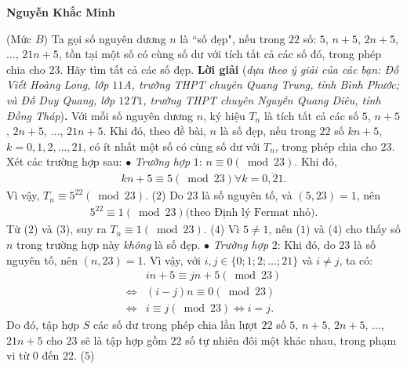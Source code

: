 \begin{multicols}{2}
	\begin{flushright}
		\textbf{\color{thachthuctoanhoc}Nguyễn Khắc Minh}
	\end{flushright}
	{}
	(Mức $B$) Ta gọi số nguyên dương $n$ là ``số đẹp", nếu trong $22$ số: $5$, $n + 5$, $2n + 5$, $\ldots$, $21n + 5$, tồn tại một số có cùng số dư với tích tất cả các số đó, trong phép chia cho $23$. Hãy tìm tất cả các số đẹp.
	\vskip 0.05cm
	\textbf{\color{thachthuctoanhoc}Lời giải} (\textit{dựa theo ý giải của các bạn: Đỗ Viết Hoàng Long, lớp $11$A, trường THPT chuyên Quang Trung, tỉnh Bình Phước; và Đỗ Duy Quang, lớp $12$T$1$, trường THPT chuyên Nguyễn Quang Diêu, tỉnh Đồng Tháp})\textbf{\color{thachthuctoanhoc}.}
	\vskip 0.05cm
	Với mỗi số nguyên dương $n$, ký hiệu $T_n$ là tích tất cả các số $5$, $n + 5$, $2n + 5$, $\ldots$, $21n + 5$.
	\vskip 0.05cm
	Khi đó, theo đề bài, $n$ là số đẹp, nếu trong $22$ số $kn + 5$, $k = 0, 1, 2, \ldots, 21$, có ít nhất một số có cùng số dư với  $T_n$, trong phép chia cho $23$.
	\vskip 0.05cm
	Xét các trường hợp sau:
	\vskip 0.05cm
	$\bullet$ \textit{Trường hợp} $1$: $n \equiv 0\left( {\bmod 23} \right).$
	\vskip 0.05cm  
	Khi đó,
	\begin{align*}
		kn + 5 \equiv 5\left( {\bmod 23} \right)\forall k = \overline {0,21} . \tag{$1$}
	\end{align*}
	Vì vậy, ${T_n} \equiv {5^{22}}\left( {\bmod 23} \right).$ \hfill ($2$)
	\vskip 0.05cm
	Do $23$ là số nguyên tố, và $(5, 23) = 1$, nên
	\begin{align*}
		{5^{22}} \equiv 1\left( {\bmod 23} \right)	\text{(theo Định lý Fermat nhỏ).} \tag{$3$}
	\end{align*}
	Từ ($2$) và ($3$), suy ra  ${T_n} \equiv 1\left( {\bmod 23} \right).$ \hfill ($4$)
	\vskip 0.05cm
	Vì $5 \ne 1$, nên ($1$) và ($4$) cho thấy số $n$ trong trường hợp này \textit{không} là số đẹp.
	\vskip 0.05cm
	$\bullet$ \textit{Trường hợp} $2$:
	\vskip 0.05cm  
	Khi đó, do $23$ là số nguyên tố, nên $(n, 23) = 1$.
	\vskip 0.05cm
	Vì vậy, với $i, j \in \{0; 1; 2; \ldots; 21\}$ và $i \ne j$, ta có:
	\begin{align*}
		&in + 5 \equiv jn + 5\left( {\bmod 23} \right)\\
		\Leftrightarrow &\left( {i - j} \right)n \equiv 0\left( {\bmod 23} \right)\\
		\Leftrightarrow & i \equiv j\left( {\bmod 23} \right) \Leftrightarrow i = j.
	\end{align*}
	Do đó, tập hợp $S$ các số dư trong phép chia lần lượt $22$ số $5$, $n + 5$, $2n + 5$, $\ldots$, $21n + 5$ cho $23$ sẽ là tập hợp gồm $22$ số tự nhiên đôi một khác nhau, trong phạm vi từ $0$ đến $22$. \hfill  ($5$)

\end{multicols}
